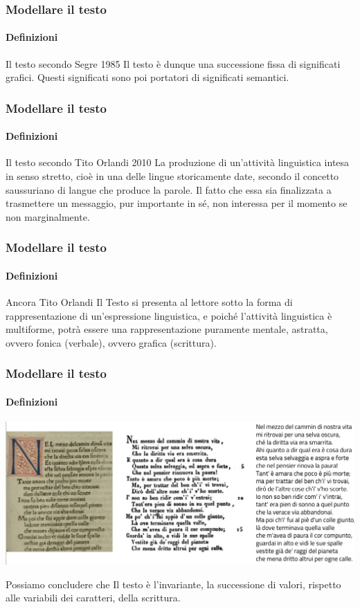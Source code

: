 \begin{frame}
	\frametitle{Modellare il testo}
	\framesubtitle{Definizioni}
	\addtocounter{nframe}{1}

	\begin{block}{Il testo secondo Segre 1985}
		Il testo è dunque una successione fissa di significati grafici. Questi significati sono poi portatori di significati semantici.
	\end{block}

\end{frame}

\begin{frame}
	\frametitle{Modellare il testo}
	\framesubtitle{Definizioni}
	\addtocounter{nframe}{1}

	\begin{block}{Il testo secondo Tito Orlandi 2010}
		La produzione di un'attività linguistica intesa in senso stretto, cioè in una delle lingue storicamente date, secondo il concetto saussuriano di langue che produce la parole. Il fatto che essa sia finalizzata a trasmettere un messaggio, pur importante in sé, non interessa per il momento se non marginalmente.
	\end{block}

\end{frame}


\begin{frame}
	\frametitle{Modellare il testo}
	\framesubtitle{Definizioni}
	\addtocounter{nframe}{1}

	\begin{block}{Ancora Tito Orlandi}
		Il Testo si presenta al lettore sotto la forma di rappresentazione di un'espressione linguistica, e poiché l'attività linguistica è multiforme, potrà essere una rappresentazione puramente mentale, astratta, ovvero fonica (verbale), ovvero grafica (scrittura).
	\end{block}


\end{frame}


\begin{frame}
	\frametitle{Modellare il testo}
	\framesubtitle{Definizioni}
	\addtocounter{nframe}{1}

	\begin{center}
		\includegraphics[width=.9\textwidth]{imgs/TestoDante.png}
	\end{center}

	\begin{block}{Possiamo concludere che}
		Il testo è l'invariante, la successione di valori, rispetto alle variabili dei caratteri, della scrittura.
	\end{block}

\end{frame}


